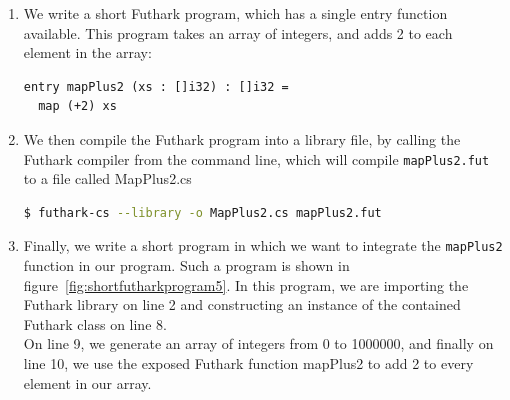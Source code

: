 \begin{enumerate}
\item We write a short Futhark program, which has a single entry function
  available. This program takes an array of integers, and
adds 2 to each element in the array:
  \begin{lstlisting}[language=Futhark]
entry mapPlus2 (xs : []i32) : []i32 =
  map (+2) xs
  \end{lstlisting}


\item We then compile the Futhark program into a library file, by calling the
  Futhark compiler from the command line, %
which will compile \texttt{mapPlus2.fut} to a \csharp{} file called MapPlus2.cs
  \begin{lstlisting}[language=sh]
$ futhark-cs --library -o MapPlus2.cs mapPlus2.fut
  \end{lstlisting}

\item Finally, we write a short \csharp{} program in which we want to integrate
  the {\tt mapPlus2} function in our program. Such a program is shown in 
    figure~\ref{fig:shortfutharkprogram5}.
  In this program, we are importing the Futhark library on line 2 and constructing
  an instance of the contained Futhark class on line 8.\\
  On line 9, we generate an array of integers from 0 to 1000000, and finally
  on line 10, we use the exposed Futhark function mapPlus2 to add 2 to every
  element in our array.
\end{enumerate}

%

